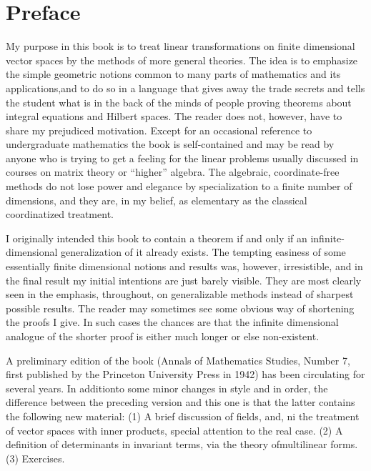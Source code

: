 \chapter{Preface}

My purpose in this book is to treat linear transformations on finite dimensional
vector spaces by the methods of more general theories. The idea is to emphasize
the simple geometric notions common to many parts of mathematics and its
applications,and to do so in a language that gives away the trade secrets and
tells the student what is in the back of the minds of people proving theorems
about integral equations and Hilbert spaces. The reader does not, however, have
to share my prejudiced motivation. Except for an occasional reference to
undergraduate mathematics the book is self-contained and may be read by anyone
who is trying to get a feeling for the linear problems usually discussed in
courses on matrix theory or ``higher'' algebra. The algebraic, coordinate-free
methods do not lose power and elegance by specialization to a finite number of
dimensions, and they are, in my belief, as elementary as the classical
coordinatized treatment.

I originally intended this book to contain a theorem if and only if an
infinite-dimensional generalization of it already exists. The tempting easiness
of some essentially finite dimensional notions and results was, however,
irresistible, and in the final result my initial intentions are just barely
visible. They are most clearly seen in the emphasis, throughout, on
generalizable methods instead of sharpest possible results. The reader may
sometimes see some obvious way of shortening the proofs I give. In such cases
the chances are that the infinite dimensional analogue of the shorter proof is
either much longer or else non-existent.

A preliminary edition of the book (Annals of Mathematics Studies, Number 7,
first published by the Princeton University Press in 1942) has been circulating
for several years. In additionto some minor changes in style and in order, the
difference between the preceding version and this one is that the latter
contains the following new material: (1) A brief discussion of fields, and, ni
the treatment of vector spaces with inner products, special attention to the real
case. (2) A definition of determinants in invariant terms, via the theory
ofmultilinear forms. (3) Exercises.

